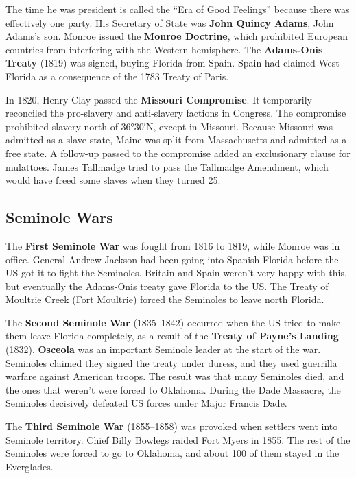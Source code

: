 The time he was president is called the ``Era of Good Feelings'' because there was effectively one party.
His Secretary of State was \textbf{John Quincy Adams}, John Adams's son.
Monroe issued the \textbf{Monroe Doctrine},
which prohibited European countries from interfering with the Western hemisphere.
The \textbf{Adams-Onis Treaty} (1819) was signed, buying Florida from Spain.
Spain had claimed West Florida as a consequence of the 1783 Treaty of Paris.

In 1820, Henry Clay passed the \textbf{Missouri Compromise}.
It temporarily reconciled the pro-slavery and anti-slavery factions in Congress.
The compromise prohibited slavery north of \ang{36;30;}N, except in Missouri.
Because Missouri was admitted as a slave state, Maine was split from Massachusetts and admitted as a free state.
A follow-up passed to the compromise added an exclusionary clause for mulattoes.
James Tallmadge tried to pass the Tallmadge Amendment, which would have freed some slaves when they turned 25.

\subsection*{Seminole Wars}

The \textbf{First Seminole War} was fought from 1816 to 1819, while Monroe was in office.
General Andrew Jackson had been going into Spanish Florida before the US got it to fight the Seminoles.
Britain and Spain weren't very happy with this, but eventually the Adams-Onis treaty gave Florida to the US\@.
The Treaty of Moultrie Creek (Fort Moultrie) forced the Seminoles to leave north Florida.

The \textbf{Second Seminole War} (1835--1842) occurred when the US tried to make them leave Florida completely,
as a result of the \textbf{Treaty of Payne's Landing} (1832).
\textbf{Osceola} was an important Seminole leader at the start of the war.
Seminoles claimed they signed the treaty under duress, and they used guerrilla warfare against American troops.
The result was that many Seminoles died, and the ones that weren't were forced to Oklahoma.
During the Dade Massacre, the Seminoles decisively defeated US forces under Major Francis Dade.

The \textbf{Third Seminole War} (1855--1858) was provoked when settlers went into Seminole territory.
Chief Billy Bowlegs raided Fort Myers in 1855.
The rest of the Seminoles were forced to go to Oklahoma, and about 100 of them stayed in the Everglades.

